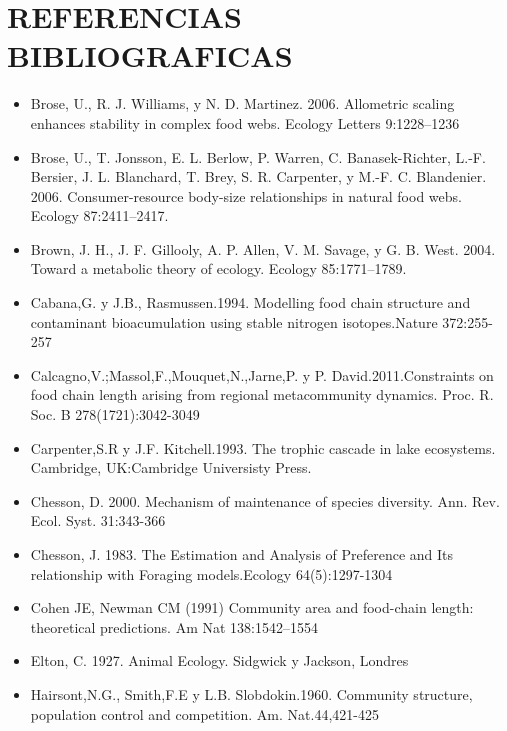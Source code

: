 \documentclass[a4paper,12pt]{article}
\begin{document}
\section{REFERENCIAS BIBLIOGRAFICAS}
\begin{itemize}
\item[] Brose, U., R. J. Williams, y N. D. Martinez. 2006. Allometric scaling enhances stability in complex food webs. Ecology Letters 9:1228–1236
\item[] Brose, U., T. Jonsson, E. L. Berlow, P. Warren, C. Banasek-Richter, L.-F. Bersier, J. L. Blanchard, T. Brey, S. R. Carpenter, y M.-F. C. Blandenier. 2006. Consumer-resource body-size relationships in natural food webs. Ecology 87:2411–2417.\\
\item[] Brown, J. H., J. F. Gillooly, A. P. Allen, V. M. Savage, y G. B. West. 2004. Toward a metabolic theory of ecology. Ecology 85:1771–1789. \\
\item[] Cabana,G. y J.B., Rasmussen.1994. Modelling food chain structure and contaminant bioacumulation using stable nitrogen isotopes.Nature 372:255-257 \\
\item[] Calcagno,V.;Massol,F.,Mouquet,N.,Jarne,P. y  P. David.2011.Constraints on food chain length arising from regional metacommunity dynamics. Proc. R. Soc. B 278(1721):3042-3049\\
\item[] Carpenter,S.R y J.F. Kitchell.1993. The trophic cascade in lake ecosystems. Cambridge, UK:Cambridge Universisty Press.\\
\item[] Chesson, D. 2000. Mechanism of maintenance of species diversity. Ann. Rev. Ecol. Syst. 31:343-366\\
\item[] Chesson, J. 1983. The Estimation and Analysis  of Preference and Its relationship with Foraging models.Ecology 64(5):1297-1304\\
\item[] Cohen JE, Newman CM (1991) Community area and food-chain length: theoretical predictions. Am Nat 138:1542–1554\\
\item[] Elton, C. 1927. Animal Ecology.  Sidgwick y Jackson, Londres\\
\item[] Hairsont,N.G., Smith,F.E y L.B. Slobdokin.1960. Community structure, population control and competition. Am. Nat.44,421-425\\

\end{itemize}
\end{document}
